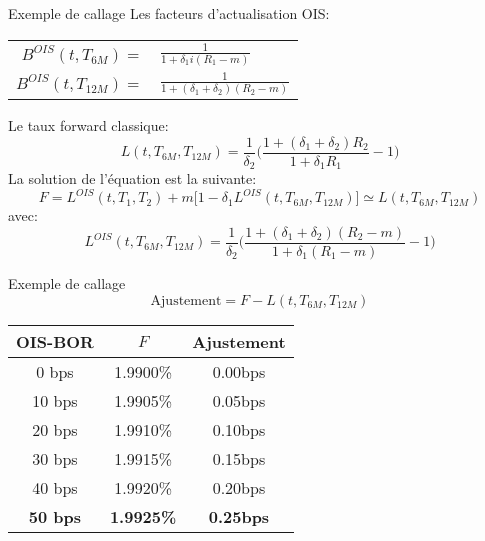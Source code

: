 \documentclass{beamer}
\begin{document}
\begin{frame}{Exemple de callage}
\small
Les facteurs d'actualisation OIS:
\begin{center}
\begin{tabular}{r l}
$B^{OIS}(t,T_{6M})=$ & $\frac{1}{1+\delta_1 i(R_1-m)}$ \\
$B^{OIS}(t,T_{12M})=$ & $\frac{1}{1+(\delta_1 + \delta_2) (R_2-m)}$ \\
\end{tabular}
\end{center}
Le taux forward classique:
\[
L(t,T_{6M},T_{12M})=\frac{1}{\delta_2}\big(\frac{1+(\delta_1+\delta_2) R_2}{1+\delta_1 R_1}-1\big)
\]
La solution de l'équation est la suivante:
\[
F=L^{OIS}(t,T_1,T_2)+m \big[ 1 - \delta_1 L^{OIS}(t,T_{6M},T_{12M}) \big] \simeq L(t,T_{6M},T_{12M})
\]
avec:
\[
L^{OIS}(t,T_{6M},T_{12M})=\frac{1}{\delta_2}\big(\frac{1+(\delta_1+\delta_2) (R_2-m)}{1+\delta_1 (R_1-m)}-1\big)
\]
\end{frame}

\begin{frame}{Exemple de callage}
\[
\text{Ajustement}=F-L(t,T_{6M},T_{12M})
\]
\begin{center}
\begin{tabular}{|c|c|c|}  
\hline  
OIS-BOR & $F$ & Ajustement \\ 
\hline  
0 bps & 1.9900\%&0.00bps\\ 
10 bps & 1.9905\%&0.05bps\\ 
20 bps & 1.9910\%&0.10bps\\ 
30 bps & 1.9915\%&0.15bps\\ 
40 bps & 1.9920\%&0.20bps\\ 
\textbf{\color{red}50 bps} & \textbf{\color{red}1.9925\%}&\textbf{\color{red}0.25bps}\\ 
\hline 
\end{tabular}
\end{center}
\end{frame}
\end{document}
